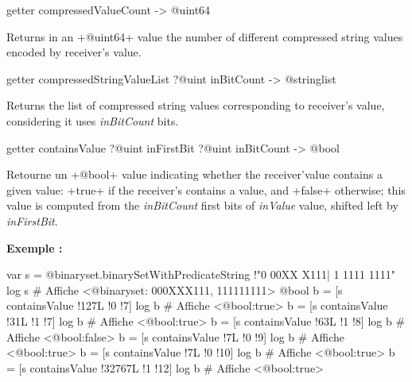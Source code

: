 
\begin{galgas3box}
getter compressedValueCount -> @uint64
\end{galgas3box}

Returns in an \ggst+@uint64+ value the number of different compressed string values encoded by receiver's value.




\begin{galgas3box}
getter compressedStringValueList ?@uint inBitCount -> @stringlist
\end{galgas3box}

Returns the list of compressed string values corresponding to receiver's value, considering it uses \emph{inBitCount} bits.











\begin{galgas3box}
getter containsValue ?@uint inFirstBit ?@uint inBitCount -> @bool
\end{galgas3box}


Retourne un \ggst+@bool+ value indicating whether the receiver'value contains a given value: \ggst+true+ if the receiver's contains a value, and \ggst+false+ otherwise; this value is computed from the \emph{inBitCount} first bits of \emph{inValue} value, shifted left by \emph{inFirstBit}.


\textbf{Exemple :}
\begin{galgas3}
var s = @binaryset.binarySetWithPredicateString {!"0 00XX X111| 1 1111 1111"}
log s # Affiche <@binaryset: 000XXX111, 111111111>
@bool b = [s containsValue !127L !0 !7]
log b # Affiche <@bool:true>
b = [s containsValue !31L !1 !7]
log b # Affiche <@bool:true>
b = [s containsValue !63L !1 !8]
log b # Affiche <@bool:false>
b = [s containsValue !7L !0 !9]
log b # Affiche <@bool:true>
b = [s containsValue !7L !0 !10]
log b # Affiche <@bool:true>
b = [s containsValue !32767L !1 !12]
log b # Affiche <@bool:true>
\end{galgas3}









